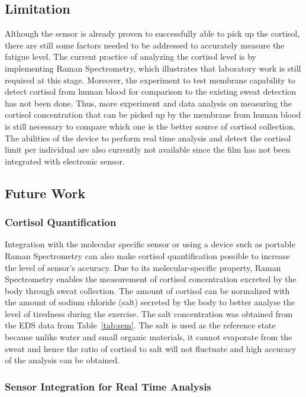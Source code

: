 \documentclass[journal]{IEEEtran}
\begin{document}
\subsection{Limitation}

Although the sensor is already proven to successfully able to pick up the cortisol, there are still some factors needed to be addressed to accurately measure the fatigue level. The current practice of analyzing the cortisol level is by implementing Raman Spectrometry, which illustrates that laboratory work is still required at this stage. Moreover, the experiment to test membrane capability to detect cortisol from human blood for comparison to the existing sweat detection has not been done. Thus, more experiment and data analysis on measuring the cortisol concentration that can be picked up by the membrane from human blood is still necessary to compare which one is the better source of cortisol collection. The abilities of the device to perform real time analysis and detect the cortisol limit per individual are also currently not available since the film has not been integrated with electronic sensor. 

\subsection{Future Work}
\subsubsection{Cortisol Quantification}

Integration with the molecular specific sensor or using a device such as portable Raman Spectrometry can also make cortisol quantification possible to increase the level of sensor’s accuracy. Due to its molecular-specific property, Raman Spectrometry enables the measurement of cortisol concentration excreted by the body through sweat collection. The amount of cortisol can be normalized with the amount of sodium chloride (salt) secreted by the body to better analyse the level of tiredness during the exercise. The salt concentration was obtained from the EDS data from Table~\ref{tab:sem}. The salt is used as the reference state because unlike water and small organic materials, it cannot evaporate from the sweat and hence the ratio of cortisol to salt will not fluctuate and high accuracy of the analysis can be obtained. 

\subsubsection{Sensor Integration for Real Time Analysis}
\end{document}
